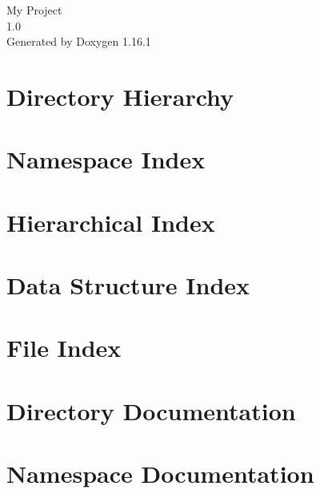 \documentclass[twoside]{book}
\newcommand{\+}{\discretionary{\mbox{\scriptsize$\hookleftarrow$}}{}{}}
\newcommand{\clearemptydoublepage}{%
    \newpage{\pagestyle{empty}\cleardoublepage}%
  }
\begin{document}
  \raggedbottom
    \hypersetup{pageanchor=false,
                bookmarksnumbered=true,
                pdfencoding=unicode
               }
  \begin{titlepage}
  \vspace*{7cm}
  \begin{center}%
  {\Large My Project}\\
  [1ex]\large 1.\+0 \\
  \vspace*{1cm}
  {\large Generated by Doxygen 1.16.1}\\
  \end{center}
  \end{titlepage}
  \clearemptydoublepage
  \tableofcontents
  \clearemptydoublepage
  \hypersetup{pageanchor=true}
\chapter{Directory Hierarchy}

\chapter{Namespace Index}

\chapter{Hierarchical Index}

\chapter{Data Structure Index}

\chapter{File Index}

\chapter{Directory Documentation}




\chapter{Namespace Documentation}

\end{document}
